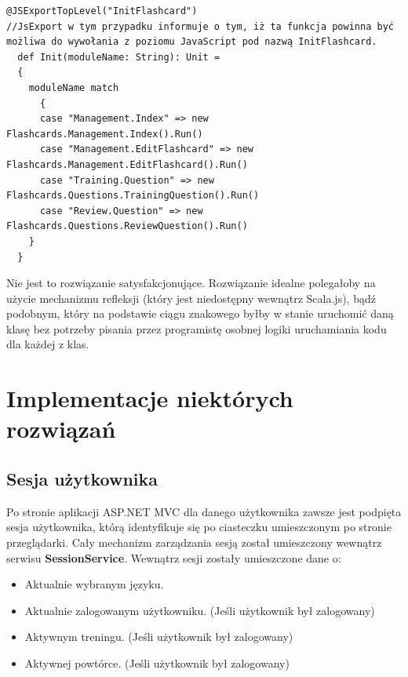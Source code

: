 \begin{minipage}{\linewidth}
\begin{lstlisting}[label=lst:bundles,
frame=single, numbers=none,captionpos=b, 
caption={Dodanie paczek ze skryptami dla BundleConfig.}]
@JSExportTopLevel("InitFlashcard")
//JsExport w tym przypadku informuje o tym, iż ta funkcja powinna być możliwa do wywołania z poziomu JavaScript pod nazwą InitFlashcard.
  def Init(moduleName: String): Unit =
  {
    moduleName match
      {
      case "Management.Index" => new  Flashcards.Management.Index().Run()
      case "Management.EditFlashcard" => new  Flashcards.Management.EditFlashcard().Run()
      case "Training.Question" => new Flashcards.Questions.TrainingQuestion().Run()
      case "Review.Question" => new Flashcards.Questions.ReviewQuestion().Run()
    }
  }
\end{lstlisting}
\end{minipage}

Nie jest to rozwiązanie satysfakcjonujące. Rozwiązanie idealne polegałoby na użycie mechanizmu refleksji (który jest niedostępny wewnątrz Scala.js), bądź podobnym, który na podstawie ciągu znakowego byłby w stanie uruchomić daną klasę bez potrzeby pisania przez programistę osobnej logiki uruchamiania kodu dla każdej z klas.

\section{Implementacje niektórych rozwiązań}

\subsection{Sesja użytkownika}

Po stronie aplikacji ASP.NET MVC dla danego użytkownika zawsze jest podpięta sesja użytkownika, którą identyfikuje się po ciasteczku umieszczonym po stronie przeglądarki. Cały mechanizm zarządzania sesją został umieszczony wewnątrz serwisu \textbf{SessionService}. Wewnątrz sesji zostały umieszczone dane o:

\begin{itemize}
	\item Aktualnie wybranym języku.
	\item Aktualnie zalogowanym użytkowniku. (Jeśli użytkownik był zalogowany)
	\item Aktywnym treningu. (Jeśli użytkownik był zalogowany)
	\item Aktywnej powtórce. (Jeśli użytkownik był zalogowany)
\end{itemize}

